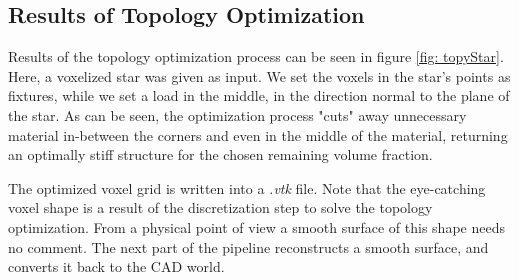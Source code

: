 \subsection{Results of Topology Optimization}
Results of the topology optimization process can be seen in figure \ref{fig: topyStar}. Here, a voxelized star was given as input. We set the voxels in the star's points as fixtures, while we set a load in the middle, in the direction normal to the plane of the star. As can be seen, the optimization process "cuts" away unnecessary material in-between the corners and even in the middle of the material, returning an optimally stiff structure for the chosen remaining volume fraction. 

The optimized voxel grid is written into a {\it.vtk} file. Note that the eye-catching voxel shape is a result of the discretization step to solve the topology optimization. From a physical point of view a smooth surface of this shape needs no comment. The next part of the pipeline reconstructs a smooth surface, and converts it back to the CAD world. 
